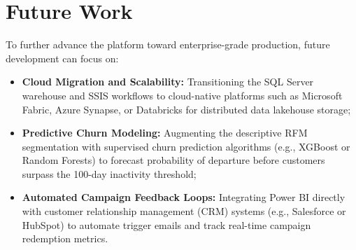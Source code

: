 \section{Future Work}
To further advance the platform toward enterprise-grade production, future development can focus on:
\begin{itemize}
    \item \textbf{Cloud Migration and Scalability:} Transitioning the SQL Server warehouse and SSIS workflows to cloud-native platforms such as Microsoft Fabric, Azure Synapse, or Databricks for distributed data lakehouse storage;
    \item \textbf{Predictive Churn Modeling:} Augmenting the descriptive RFM segmentation with supervised churn prediction algorithms (e.g., XGBoost or Random Forests) to forecast probability of departure before customers surpass the 100-day inactivity threshold;
    \item \textbf{Automated Campaign Feedback Loops:} Integrating Power BI directly with customer relationship management (CRM) systems (e.g., Salesforce or HubSpot) to automate trigger emails and track real-time campaign redemption metrics.
\end{itemize}
